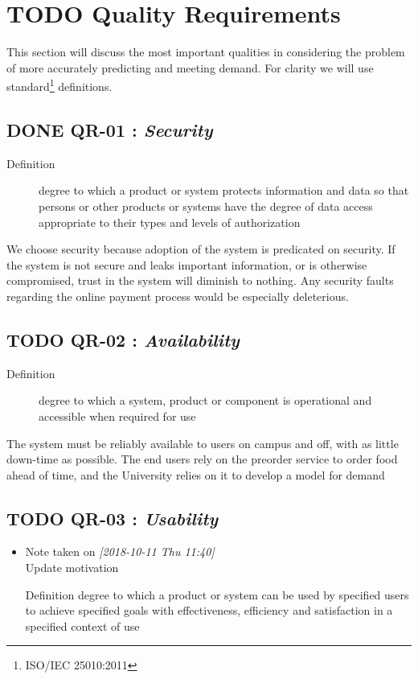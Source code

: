 \documentclass[11pt]{article}
\begin{document}
\section{{\bfseries\sffamily TODO} Quality Requirements}
\label{sec:org7e5bc9e}

This section will discuss the most important qualities in
considering the problem of more accurately predicting and meeting
demand. For clarity we will use standard\footnote{ISO/IEC 25010:2011} definitions.

\subsection{{\bfseries\sffamily DONE} \label{org09b1f52}QR-01 : \emph{Security}}
\label{sec:org69bb27d}
\begin{description}
\item[{Definition}] degree to which a product or system protects
information and data so that persons or other
products or systems have the degree of data access
appropriate to their types and levels of
authorization
\end{description}


We choose security because adoption of the system is predicated on
security. If the system is not secure and leaks important
information, or is otherwise compromised, trust in the system will
diminish to nothing. Any security faults regarding the online
payment process would be especially deleterious.
\subsection{{\bfseries\sffamily TODO} \label{org0ca1a1d}QR-02 : \emph{Availability}}
\label{sec:org8ed8c4c}
\begin{description}
\item[{Definition}] degree to which a system, product or component is
operational and accessible when required for use
\end{description}


The system must be reliably available to users on campus and off,
with as little down-time as possible. The end users rely on the
preorder service to order food ahead of time, and the University
relies on it to develop a model for demand

\subsection{{\bfseries\sffamily TODO} \label{org64b5be4}QR-03 : \emph{Usability}}
\label{sec:org64675f1}
\begin{itemize}
\item Note taken on \textit{[2018-10-11 Thu 11:40] } \\
Update motivation
\item[{Definition}] degree to which a product or system can be used by
specified users to achieve specified goals with
effectiveness, efficiency and satisfaction in a
specified context of use
\end{itemize}
\end{document}
